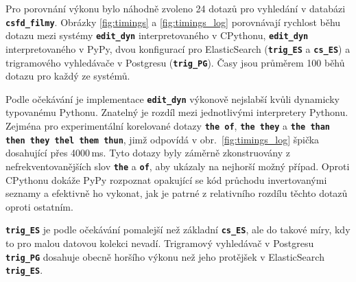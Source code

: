 \documentclass[11pt,letterpaper,oneside,openright]{book}
\newcommand{\bftt}[1]{\texttt{\textbf{#1}}}
\begin{document}
Pro porovnání výkonu bylo náhodně zvoleno 24 dotazů pro vyhledání v
databázi \bftt{csfd\_filmy}. Obrázky \ref{fig:timings} a
\ref{fig:timings_log} porovnávají rychlost běhu dotazu mezi systémy
\bftt{edit\_dyn} interpretovaného v CPythonu, \bftt{edit\_dyn}
interpretovaného v PyPy, dvou konfigurací pro ElasticSearch
(\bftt{trig\_ES} a \bftt{cs\_ES}) a trigramového vyhledávače v Postgresu
(\bftt{trig\_PG}).  Časy jsou průměrem 100 běhů dotazu pro každý ze
systémů.

Podle očekávání je implementace \bftt{edit\_dyn} výkonově nejslabší kvůli
dynamicky typovanému Pythonu. Znatelný je rozdíl mezi jednotlivými interpretery
Pythonu. Zejména pro experimentální korelované dotazy \bftt{the of}, \bftt{the
they} a \bftt{the than then they thel them thun}, jimž odpovídá v
obr.~\ref{fig:timings_log} špička dosahující přes 4000\,ms. Tyto dotazy byly
záměrně zkonstruovány z nefrekventovanějších slov \bftt{the} a \bftt{of}, aby
ukázaly na nejhorší možný případ. Oproti CPythonu dokáže PyPy rozpoznat
opakující se kód průchodu invertovanými seznamy a efektivně ho vykonat, jak je
patrné z relativního rozdílu těchto dotazů oproti ostatním.

\bftt{trig\_ES} je podle očekávání pomalejší než základní \bftt{cs\_ES}, ale do
takové míry, kdy to pro malou datovou kolekci nevadí. Trigramový vyhledávač v
Postgresu \bftt{trig\_PG} dosahuje obecně horšího výkonu než jeho protějšek v
ElasticSearch \bftt{trig\_ES}.
\end{document}
